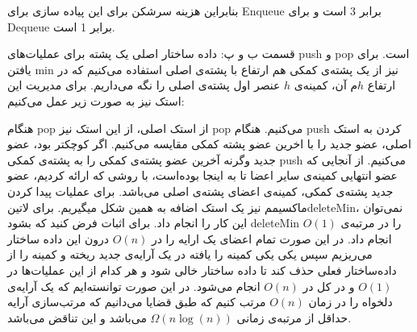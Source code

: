 {بنابراین هزینه سرشکن برای این پیاده سازی برای Enqueue برابر 3 است و برای Dequeue برابر 1 است.

قسمت ب و پ:
داده ساختار اصلی یک پشته برای عملیات‌های push و pop است. برای یافتن min نیز از یک پشته‌ی کمکی هم ارتفاع با پشته‌ی اصلی استفاده می‌کنیم که در ارتفاع $h$م آن، کمینه‌ی $h$ عنصر اول پشته‌ی اصلی را نگه می‌داریم. برای مدیریت این استک نیز به صورت زیر عمل می‌کنیم:

هنگام pop از استک اصلی، از این استک نیز pop می‌کنیم.
هنگام push کردن به استک اصلی، عضو جدید را با اخرین عضو پشته  کمکی مقایسه می‌کنیم. اگر کوچکتر بود، عضو جدید وگرنه آخرین عضو پشته‌ی کمکی را به پشته‌ی کمکی push می‌کنیم. از آنجایی که عضو انتهایی کمینه‌ی سایر اعضا تا به اینجا بوده‌است، با روشی که ارائه کردیم، عضو جدید پشته‌ی کمکی، کمینه‌ی اعضای پشته‌ی اصلی می‌باشد.
برای عملیات پیدا کردن ماکسیمم نیز یک استک اضافه به همین شکل میگیریم.
برای
‌لاتین{deleteMin}،
نمی‌توان این کار را انجام داد. برای اثبات فرض کنید که بشود deleteMin را در مرتبه‌ی $O(1)$ انجام داد.
در این صورت تمام اعضای یک ارایه را در $O(n)$ درون این داده ساختار می‌ریزیم سپس یکی یکی کمینه را یافته در یک آرایه‌ی جدید ریخته و کمینه را از داده‌ساختار فعلی حذف کند تا داده ساختار خالی شود و هر کدام از این عملیات‌ها در $O(1)$ و در کل در $O(n)$ انجام می‌شود. در این صورت
توانسته‌ایم که یک آرایه‌ی دلخواه را در زمان $O(n)$ مرتب کنیم که طبق قضایا می‌دانیم که مرتب‌سازی آرایه حداقل از مرتبه‌ی زمانی
$\Omega(n\log(n))$
می‌باشد و این تناقض می‌باشد.

}









